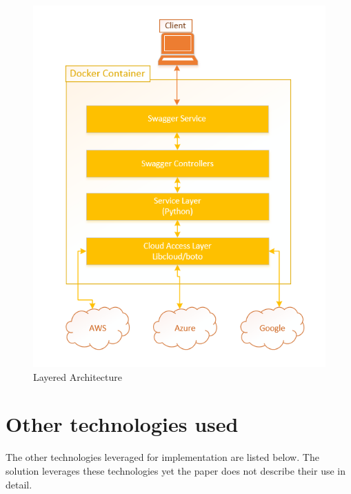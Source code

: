 \begin{figure}[ht]
  \centering
  \includegraphics[width=\columnwidth]{images/layred-arch.PNG}
  \caption{Layered Architecture}\label{f:layerd-arch}
\end{figure}

\section{Other technologies used}
The other technologies leveraged for implementation are listed below. The
solution leverages these technologies yet the paper does not describe their
use in detail.

